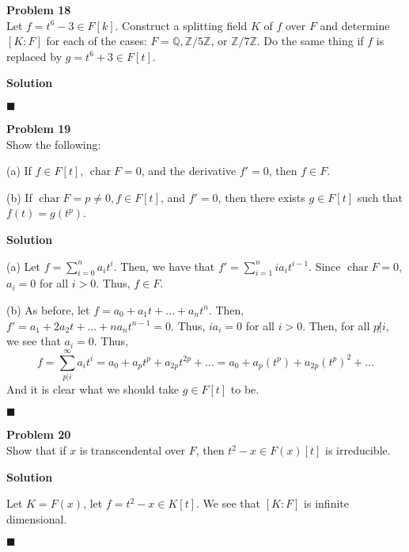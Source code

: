 \documentclass{article}
\theoremstyle{definition}
\newenvironment{problem}[2][Problem]
    { \begin{mdframed}[backgroundcolor=gray!20] \textbf{#1 #2} \\}
    {  \end{mdframed}}
\newenvironment{solution}{\textbf{Solution}}{%
     \hfill$\blacksquare$\par\medskip}
\begin{document}
    \begin{problem}{18}
    
    Let $f = t^{6} - 3 \in F\left[ k \right]$. Construct a splitting field $K$ of $f$ over $F$ and determine $\left[ K : F \right]$ for each of the cases: $F = \mathds{Q}, \mathds{Z} / 5\mathds{Z}$, or $\mathds{Z} / 7\mathds{Z}$. Do the same thing if $f$ is replaced by $g = t^{6} + 3 \in F\left[ t \right]$.
    
    \end{problem}
    
    \begin{solution}
    
    
    
    \end{solution}
    
    \begin{problem}{19}
    
    Show the following:
    
    (a) If $f \in F\left[ t \right]$, $\operatorname{char} F = 0$, and the derivative $f' = 0$, then $f \in F$.

    (b) If $\operatorname{char} F = p \neq 0, f \in F\left[ t \right]$, and $f' = 0$, then there exists $g \in F\left[ t \right]$ such that $f\left( t \right) = g\left( t^{p} \right)$.
    
    \end{problem}
    
    \begin{solution}
    
    (a) Let $f = \sum_{i = 0}^{n} a_{i}t^{i}$. Then, we have that $f' = \sum_{i = 1}^{n} ia_{i}t^{i-1}$. Since $\operatorname{char}F = 0$, $a_i = 0$ for all $i >0$. Thus, $f \in F$.

    (b) As before, let $f = a_0 + a_1t + \ldots + a_nt^{n}$. Then, $f' = a_1 + 2a_2t + \ldots + na_nt^{n-1} = 0$. Thus, $i a_i = 0$ for all $i > 0$. Then, for all $p \not| i$, we see that $a_i = 0$. Thus, 
    \begin{equation*}
        f = \sum_{p | i}^{\infty} a_i t^{i}= a_0 + a_{p}t^{p} + a_{2p}t^{2p} + \ldots = a_0 + a_{p}\left( t^{p} \right) + a_{2p}  \left( t^{p} \right)^{2} + \ldots
    \end{equation*}
    And it is clear what we should take $g \in F\left[ t \right]$ to be. 
    
    \end{solution}
    
    \begin{problem}{20}
    
    Show that if $x$ is transcendental over $F$, then $t^{2} -x \in F\left( x \right)\left[ t \right]$ is irreducible.
    
    \end{problem}
    
    \begin{solution}
    
    Let $K = F\left( x \right)$, let $f = t^{2} -x \in K\left[ t \right]$. We see that $\left[ K : F \right]$ is infinite dimensional. 
    
    \end{solution}
    
    
\end{document}
